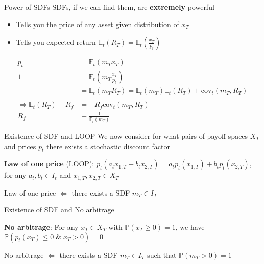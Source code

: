 \documentclass[xcolor=table, aspectratio=169]{beamer}
\begin{document}
\begin{frame}{Power of SDFs}
SDFs, if we can find them, are \textbf{extremely} powerful
\begin{itemize}
\item Tells you the price of any asset given distribution of $x_T$
\item Tells you expected return $\mathbb{E}_t(R_T) = \mathbb{E}_t\left(\frac{x_T}{p_t}\right)$
\end{itemize}
\begin{small}
\begin{align*}
p_t &= \mathbb{E}_t \left( m_T x_T \right) \\
1 &= \mathbb{E}_t \left( m_T \frac{x_T}{p_t} \right) \\
&= \mathbb{E}_t \left( m_T R_T \right) = \mathbb{E}_t \left( m_T \right) \mathbb{E}_t \left( R_T \right) + \text{cov}_t \left( m_T,R_T \right) \\
\\
\Rightarrow \mathbb{E}_t \left( R_T \right) - R_f &= - R_f \text{cov}_t \left( m_T,R_T \right) \\
R_f &\equiv \frac{1}{\mathbb{E}_t \left( m_T \right)}
\end{align*}
\end{small}
\end{frame}

\begin{frame}{Existence of SDF and LOOP}
We now consider for what pairs of payoff spaces $X_T$ and prices $p_t$ there exists a stochastic discount factor
\vskip 12pt
\begin{definition}
\textbf{Law of one price} (LOOP):
 $p_t(a_t x_{1,T} + b_t x_{2,T}) = a_t p_t(x_{1,T}) +  b_t p_t(x_{2,T})$, for any $a_t, b_t \in I_t$ and $x_{1,T}, x_{2,T} \in X_T$
\end{definition}

\begin{theorem}
Law of one price $\Leftrightarrow$ there exists a SDF $m_T \in I_T$
\end{theorem}
\end{frame}


\begin{frame}{Existence of SDF and No arbitrage}
\begin{definition}
\textbf{No arbitrage}: For any $x_T \in X_T$ with $\mathbb{P}(x_T \geq 0) = 1$, we have $\mathbb{P}( p_t(x_T) \leq 0 \; \& \; x_T > 0 ) =0$
\end{definition}
\vskip 12pt
\begin{theorem}
No arbitrage $\Leftrightarrow$ there exists a SDF $m_T \in I_T$ such that $\mathbb{P}(m_T > 0) = 1$
\end{theorem}
\end{frame}
\end{document}
